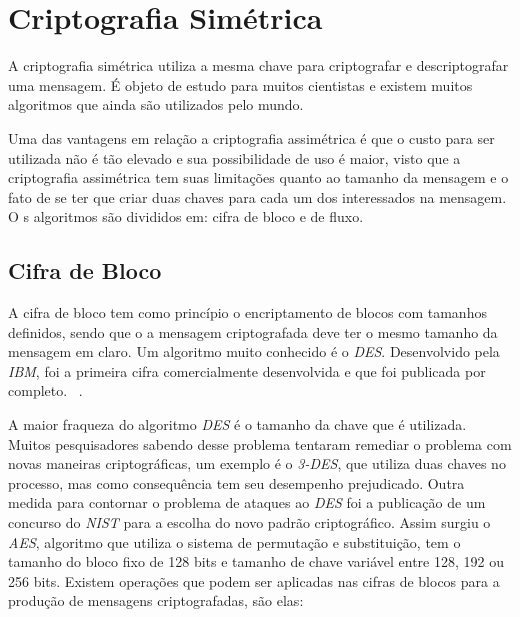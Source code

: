 %
\section{Criptografia Simétrica}
\label{symmetric-cryptography}

A criptografia simétrica utiliza a mesma chave para criptografar e descriptografar uma mensagem. É objeto de estudo para muitos cientistas e existem muitos algoritmos que ainda são utilizados pelo mundo. 

Uma das vantagens em relação a criptografia assimétrica é que o custo para ser utilizada não é tão elevado e sua possibilidade de uso é maior, visto que a criptografia assimétrica tem suas limitações quanto ao tamanho da mensagem e o fato de se ter que criar duas chaves para cada um dos interessados na mensagem. O s algoritmos são divididos em: cifra de bloco e de fluxo.

\subsection{Cifra de Bloco}
\label{block-cipher}

A cifra de bloco tem como princípio o encriptamento de blocos com tamanhos definidos, sendo que o a mensagem criptografada deve ter o mesmo tamanho da mensagem em claro. Um algoritmo muito conhecido é o \textit{DES}. Desenvolvido pela \textit{IBM}, foi a primeira cifra comercialmente desenvolvida e que foi publicada por completo. ~\cite{achar-citação}. 

A maior fraqueza do algoritmo \textit{DES} é o tamanho da chave que é utilizada. Muitos pesquisadores sabendo desse problema tentaram remediar o problema com novas maneiras criptográficas, um exemplo é o \textit{3-DES}, que utiliza duas chaves no processo, mas como consequência tem seu desempenho prejudicado. Outra medida para contornar o problema de ataques ao \textit{DES} foi a publicação de um concurso do \textit{NIST} para a escolha do novo padrão criptográfico. Assim surgiu o \textit{AES}, algoritmo que utiliza o sistema de permutação e substituição, tem o tamanho do bloco fixo de 128 bits e tamanho de chave variável entre 128, 192 ou 256 bits. Existem operações que podem ser aplicadas nas cifras de blocos para a produção de mensagens criptografadas, são elas:

